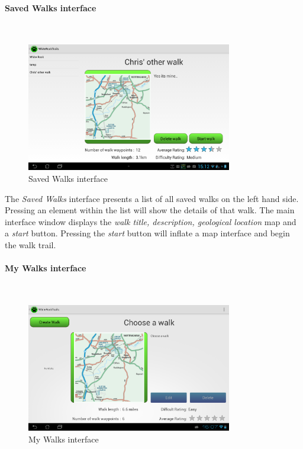 \documentclass[11pt,a4paper]{report}
\begin{document}
\paragraph*{Saved Walks interface}\mbox{}\\
\begin{figure}[H]
    \centering
    \includegraphics[width=0.8\textwidth]{chris/saved_walks}
    \caption{Saved Walks interface}
    \label{fig:saved_walks}
\end{figure}

The \emph{Saved Walks} interface presents a list of all saved walks on the left hand side. Pressing an element within the list will show the details of that walk. The main interface window displays the \emph{walk title, description, geological location} map and a \emph{start} button. Pressing the \emph{start} button will inflate a map interface and begin the walk trail.

\paragraph*{My Walks interface}\mbox{}\\

\begin{figure}[H]
    \centering
    \includegraphics[width=0.8\textwidth]{chris/my_walks}
    \caption{My Walks interface}
    \label{fig:my_walks}
\end{figure}
\end{document}
